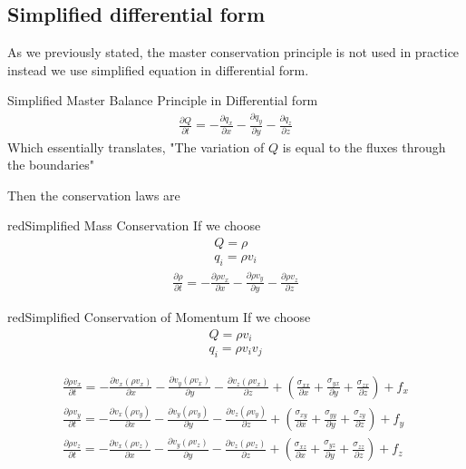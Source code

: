 \documentclass[a4paper, 11pt,article,oneside]{memoir}%
\begin{document}
\subsection{Simplified differential form}
As we previously stated, the master conservation principle is not used in practice instead we use simplified  equation in differential form.
\begin{eqbox2}{}{Simplified  Master Balance Principle in  Differential form}
\begin{gather*}
\frac{\partial Q}{\partial t}=-\frac{\partial q_x}{\partial x}-\frac{\partial q_y}{\partial y}-\frac{\partial q_z}{\partial z}
\end{gather*}
Which essentially translates, "The variation of $Q$ is equal to the fluxes through the boundaries"
\end{eqbox2}
Then the conservation laws are
\begin{eqbox2}{red}{Simplified Mass Conservation}
If we choose 
\begin{gather*}
Q=\rho \\
q_i=\rho v_i
\end{gather*}
\begin{gather*}
\frac{\partial \rho}{\partial t}=-\frac{\partial \rho v_x}{\partial x}-\frac{\partial \rho v_y}{\partial y}-\frac{\partial \rho v_z}{\partial z}
\end{gather*}
\end{eqbox2}
\begin{eqbox2}{red}{Simplified Conservation of Momentum}
If we choose 
\begin{gather*}
Q=\rho v_i \\
q_i=\rho v_i v_j
\end{gather*}

\begin{align*}
\frac{\partial \rho v_x}{\partial t}=-\frac{\partial v_x( \rho v_x)}{\partial x}-\frac{\partial v_y( \rho v_x)}{\partial y}-\frac{\partial v_z( \rho v_x)}{\partial z}+\left(\frac{\sigma_{xx}}{\partial x}+\frac{\sigma_{yx}}{\partial y}+\frac{\sigma_{zx}}{\partial z}\right)+f_x\\
\frac{\partial \rho v_y}{\partial t}=-\frac{\partial v_x( \rho v_y)}{\partial x}-\frac{\partial v_y( \rho v_y)}{\partial y}-\frac{\partial v_z( \rho v_y)}{\partial z}+\left(\frac{\sigma_{xy}}{\partial x}+\frac{\sigma_{yy}}{\partial y}+\frac{\sigma_{zy}}{\partial z}\right)+f_y\\
\frac{\partial \rho v_z}{\partial t}=-\frac{\partial v_x( \rho v_z)}{\partial x}-\frac{\partial v_y( \rho v_z)}{\partial y}-\frac{\partial v_z( \rho v_z)}{\partial z}+\left(\frac{\sigma_{xz}}{\partial x}+\frac{\sigma_{yz}}{\partial y}+\frac{\sigma_{zz}}{\partial z}\right)+f_z\\
\end{align*}

\end{eqbox2}
\end{document}
